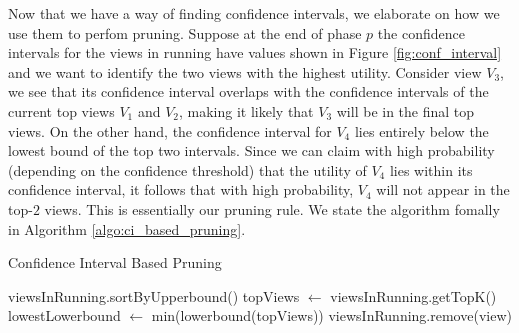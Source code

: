 Now that we have a way of finding confidence intervals, we elaborate on how we
use them to perfom pruning.
Suppose at the end of phase $p$ the confidence intervals for the views in
running have values shown in Figure \ref{fig:conf_interval} and we want to
identify the two views with the highest utility.
Consider view $V_3$, we see that its confidence interval overlaps with the
confidence intervals of the current top views $V_1$ and $V_2$, making it likely
that $V_3$ will be in the final top views. On the other hand, the confidence
interval for $V_4$ lies entirely below the lowest bound of the top two
intervals.
Since we can claim with high probability (depending on the confidence threshold)
that the utility of $V_4$ lies within its confidence interval, it follows that
with high probability, $V_4$ will not appear in the top-$2$ views.
This is essentially our pruning rule. 
We state the algorithm fomally in
Algorithm \ref{algo:ci_based_pruning}.

\begin{algorithm}
\caption{Confidence Interval Based Pruning}
\label{algo:ci_based_pruning}
\begin{algorithmic}[1]
\State viewsInRunning.sortByUpperbound()
\State topViews $\gets$ viewsInRunning.getTopK()
\State lowestLowerbound $\gets$ min(lowerbound(topViews))
\State viewsInRunning.remove(view)
\EndIf
\EndFor
\end{algorithmic}
\end{algorithm}

